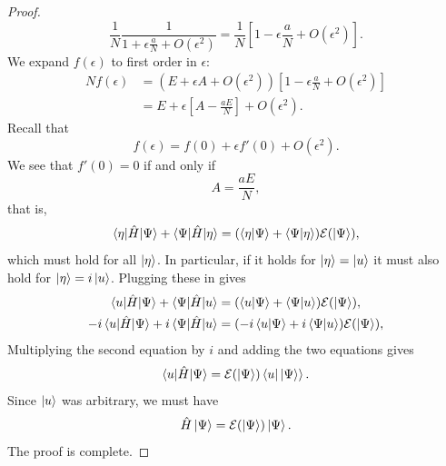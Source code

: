 \documentclass{report}
\theoremstyle{plain}
\theoremstyle{definition}
\begin{document}
\begin{proof}
  \begin{equation}
    \frac{1}{N} \frac{1}{ 1 + \epsilon \frac{a}{N} + O(\epsilon^2)} =
    \frac{1}{N} \left[ 1 - \epsilon
      \frac{a}{N} + O(\epsilon^2) \right].
  \end{equation}
  We expand $f(\epsilon)$ to first
  order in $\epsilon$:
  \begin{equation}
    \begin{split}
      N f(\epsilon) &=
      \left(E +
        \epsilon A + O(\epsilon^2)\right)\left[1 - \epsilon
        \frac{a}{N} + O(\epsilon^2) \right]  \\
      &  =  E  + \epsilon\left[A - \frac{a
          E}{N} \right] + O(\epsilon^2).
    \end{split}
  \end{equation}
  Recall that
  \begin{equation}
    f(\epsilon) = f(0) + \epsilon f'(0) +   O(\epsilon^2).
  \end{equation}
  We see that $f'(0)=0$ if and only if
  \begin{equation}
    A = \frac{aE}{N},
  \end{equation}
  that is,
  \begin{equation}
    \braket{\eta|\hat{H}|\Psi} + \braket{\Psi|\hat{H}|\eta} =
    (\braket{\eta|\Psi} + \braket{\Psi|\eta}) \mathcal{E}(\ket{\Psi}),
  \end{equation}
  which must hold for all $\ket{\eta}$. In particular, if it holds for
  $\ket{\eta}=\ket{u}$ it must also hold for $\ket{\eta} =
  i\ket{u}$. Plugging these in gives
  \begin{gather}
    \braket{u|\hat{H}|\Psi} + \braket{\Psi|\hat{H}|u} =
    (\braket{u|\Psi} + \braket{\Psi|u}) \mathcal{E}(\ket{\Psi}),
    \\
    -i\braket{u|\hat{H}|\Psi} + i\braket{\Psi|\hat{H}|u} =
    (-i\braket{u|\Psi} + i\braket{\Psi|u}) \mathcal{E}(\ket{\Psi}),
  \end{gather}
  Multiplying the second equation by $i$ and adding the two equations
  gives
  \begin{equation}
    \braket{u|\hat{H}|\Psi} =
    \mathcal{E}(\ket{\Psi})\braket{u|\ket{\Psi}}.
  \end{equation}
  Since $\ket{u}$ was arbitrary, we must have
  \begin{equation}
    \hat{H}\ket{\Psi} = \mathcal{E}(\ket{\Psi}) \ket{\Psi}.
  \end{equation}
  The proof is complete.
\end{proof}
\end{document}
